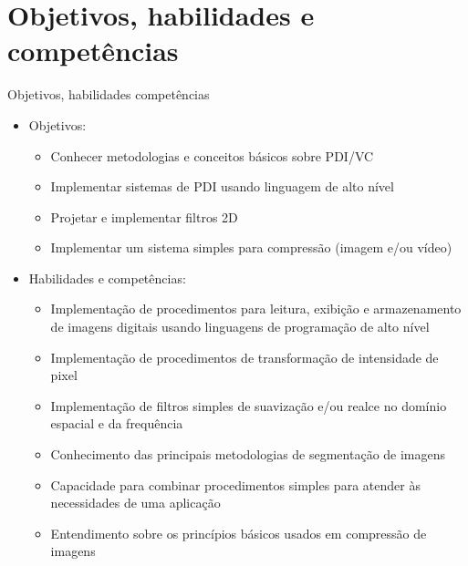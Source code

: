    \section[slide=true]{Objetivos, habilidades e competências}
      \begin{slide}[toc=]{Objetivos, habilidades competências}
         \begin{itemize}
            \item Objetivos:
		    \begin{itemize}
			    \item Conhecer metodologias e conceitos básicos sobre PDI/VC
			    \item Implementar sistemas de PDI usando linguagem de alto nível
			    \item Projetar e implementar filtros 2D
			    \item Implementar um sistema simples para compressão (imagem e/ou vídeo) 
		    \end{itemize}
	     \item Habilidades e competências:
		     \begin{itemize}
			     \item Implementação de procedimentos para leitura, exibição e armazenamento de imagens digitais usando linguagens de programação de alto nível
			     \item Implementação de procedimentos de transformação de intensidade de pixel 
			     \item Implementação de filtros simples de suavização e/ou realce no domínio espacial e da frequência 
			     \item Conhecimento das principais metodologias de segmentação de imagens %
			     \item Capacidade para combinar procedimentos simples para atender às necessidades de uma aplicação
			     \item Entendimento sobre os princípios básicos usados em compressão de imagens
	            \end{itemize}
         \end{itemize}
   \end{slide}


